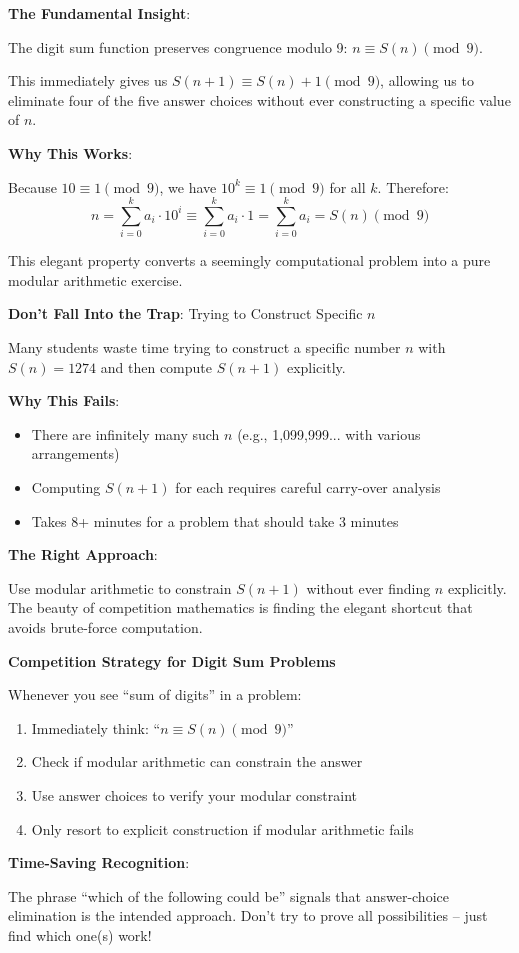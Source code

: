 \documentclass[]{article}
\begin{document}
\begin{keyinsightbox}
\textbf{The Fundamental Insight}:

The digit sum function preserves congruence modulo 9: $n \equiv S(n) \pmod{9}$.

This immediately gives us $S(n+1) \equiv S(n) + 1 \pmod{9}$, allowing us to eliminate four of the five answer choices without ever constructing a specific value of $n$.

\textbf{Why This Works}:

Because $10 \equiv 1 \pmod{9}$, we have $10^k \equiv 1 \pmod{9}$ for all $k$. Therefore:
\[n = \sum_{i=0}^{k} a_i \cdot 10^i \equiv \sum_{i=0}^{k} a_i \cdot 1 = \sum_{i=0}^{k} a_i = S(n) \pmod{9}\]

This elegant property converts a seemingly computational problem into a pure modular arithmetic exercise.
\end{keyinsightbox}

\begin{warningbox}
\textbf{Don't Fall Into the Trap}: Trying to Construct Specific $n$

Many students waste time trying to construct a specific number $n$ with $S(n) = 1274$ and then compute $S(n+1)$ explicitly.

\textbf{Why This Fails}:
\begin{itemize}
    \item There are infinitely many such $n$ (e.g., 1,099,999... with various arrangements)
    \item Computing $S(n+1)$ for each requires careful carry-over analysis
    \item Takes 8+ minutes for a problem that should take 3 minutes
\end{itemize}

\textbf{The Right Approach}:

Use modular arithmetic to constrain $S(n+1)$ without ever finding $n$ explicitly. The beauty of competition mathematics is finding the elegant shortcut that avoids brute-force computation.
\end{warningbox}

\begin{tipbox}
\textbf{Competition Strategy for Digit Sum Problems}

Whenever you see ``sum of digits'' in a problem:
\begin{enumerate}
    \item Immediately think: ``$n \equiv S(n) \pmod{9}$''
    \item Check if modular arithmetic can constrain the answer
    \item Use answer choices to verify your modular constraint
    \item Only resort to explicit construction if modular arithmetic fails
\end{enumerate}

\textbf{Time-Saving Recognition}:

The phrase ``which of the following could be'' signals that answer-choice elimination is the intended approach. Don't try to prove all possibilities -- just find which one(s) work!
\end{tipbox}
\end{document}

